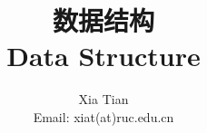 \documentclass[table, 13pt, slidestop,compress,mathserif]{beamer}
\begin{document}
\title{数据结构 \\ Data Structure}
\author{Xia Tian \\ Email: xiat(at)ruc.edu.cn }
\date{
}
\frame{\titlepage}





\end{document}
